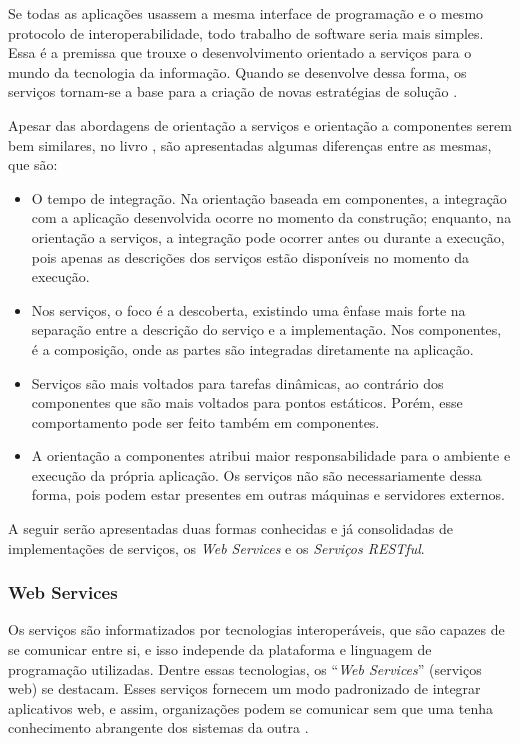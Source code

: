 Se todas as aplicações usassem a mesma interface de programação e o mesmo protocolo de interoperabilidade, todo trabalho de software seria mais simples. Essa é a premissa que trouxe o desenvolvimento orientado a serviços para o mundo da tecnologia da informação. Quando se desenvolve dessa forma, os serviços tornam-se a base para a criação de novas estratégias de solução \cite{Newcomer:Lomow:2004}.

Apesar das abordagens de orientação a serviços e orientação a componentes serem bem similares, no livro \cite{Stojanovic:Dahanayake:2005}, são apresentadas algumas diferenças entre as mesmas, que são:

\begin{itemize}
	\item O tempo de integração. Na orientação baseada em componentes, a integração com a aplicação desenvolvida ocorre no momento da construção; enquanto, na orientação a serviços, a integração pode ocorrer antes ou durante a execução, pois apenas as descrições dos serviços estão disponíveis no momento da execução.
	\item Nos serviços, o foco é a descoberta, existindo uma ênfase mais forte na separação entre a descrição do serviço e a implementação. Nos componentes, é a composição, onde as partes são integradas diretamente na aplicação.
	\item Serviços são mais voltados para tarefas dinâmicas, ao contrário dos componentes que são mais voltados para pontos estáticos. Porém, esse comportamento pode ser feito também em componentes.
	\item A orientação a componentes atribui maior responsabilidade para o ambiente e execução da própria aplicação. Os serviços não são necessariamente dessa forma, pois podem estar presentes em outras máquinas e servidores externos.
\end{itemize}

A seguir serão apresentadas duas formas conhecidas e já consolidadas de implementações de serviços, os \textit{Web Services} e os \textit{Serviços RESTful}.

\subsubsection{Web Services}

Os serviços são informatizados por tecnologias interoperáveis, que são capazes de se comunicar entre si, e isso independe da plataforma e linguagem de programação utilizadas. Dentre essas tecnologias, os ``\textit{Web Services}'' (serviços web) se destacam. Esses serviços fornecem um modo padronizado de integrar aplicativos web, e assim, organizações podem se comunicar sem que uma tenha conhecimento abrangente dos sistemas da outra \cite{Victorino:Brascher:2009}.

